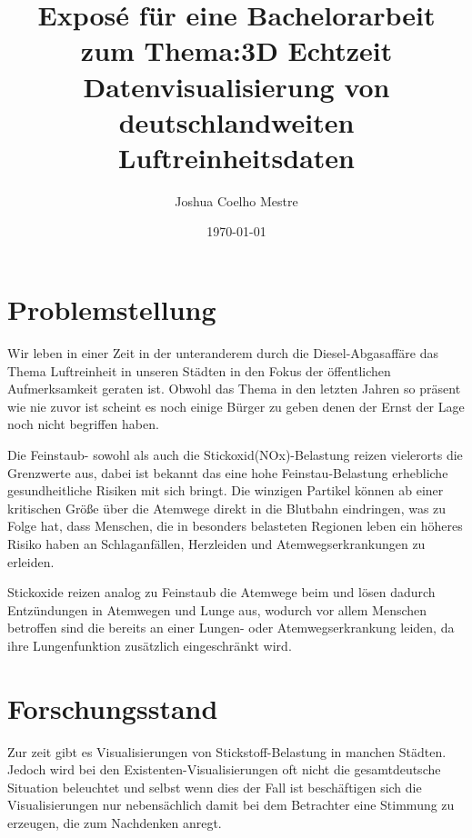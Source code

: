 \documentclass[12pt]{article} %
\title{Exposé für eine Bachelorarbeit zum Thema:\newline 3D Echtzeit Datenvisualisierung von deutschlandweiten Luftreinheitsdaten}
\author{Joshua Coelho Mestre}
\date{\today} %
\begin{document}
\maketitle
\newpage
\tableofcontents %
\newpage %

\section{Problemstellung} \label{sec:Problemstellung}

Wir leben in einer Zeit in der unteranderem durch die Diesel-Abgasaffäre das Thema Luftreinheit in unseren Städten in den Fokus der öffentlichen Aufmerksamkeit geraten ist.
Obwohl das Thema in den letzten Jahren so präsent wie nie zuvor ist scheint es noch einige Bürger zu geben denen der Ernst der Lage noch nicht begriffen haben.

Die Feinstaub- sowohl als auch die Stickoxid(NOx)-Belastung reizen vielerorts die Grenzwerte aus, dabei ist bekannt das eine hohe Feinstau-Belastung erhebliche gesundheitliche Risiken mit sich bringt.
Die winzigen Partikel können ab einer kritischen Größe über die Atemwege direkt in die Blutbahn eindringen, was zu Folge hat, dass Menschen, die in besonders belasteten Regionen leben ein höheres Risiko haben an Schlaganfällen, Herzleiden und Atemwegserkrankungen zu erleiden.\cite{studie:1}

Stickoxide reizen analog zu Feinstaub die Atemwege beim und lösen dadurch Entzündungen in Atemwegen und Lunge aus, wodurch vor allem Menschen betroffen sind die bereits an einer Lungen- oder Atemwegserkrankung leiden, da ihre Lungenfunktion zusätzlich eingeschränkt wird.

\section{Forschungsstand} \label{sec:Forschungsstand}

Zur zeit gibt es Visualisierungen von Stickstoff-Belastung in manchen Städten.
Jedoch wird bei den Existenten-Visualisierungen oft nicht die gesamtdeutsche Situation beleuchtet und selbst wenn dies der Fall ist beschäftigen sich die Visualisierungen nur nebensächlich damit bei dem Betrachter eine Stimmung zu erzeugen, die zum Nachdenken anregt.
\end{document}
